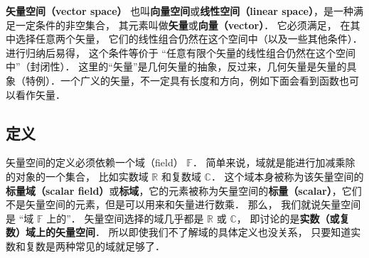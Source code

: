 

\textbf{矢量空间（vector space）} 也叫\textbf{向量空间}或\textbf{线性空间（linear space）}，是一种满足一定条件的非空集合， 其元素叫做\textbf{矢量}或\textbf{向量（vector）}． 它必须满足， 在其中选择任意两个矢量， 它们的线性组合仍然在这个空间中（以及一些其他条件）． 进行归纳后易得， 这个条件等价于 “任意有限个矢量的线性组合仍然在这个空间中”（封闭性）． 这里的“矢量”是几何矢量的抽象，反过来，几何矢量是矢量的具象（特例）．一个广义的矢量，不一定具有长度和方向，例如下面会看到函数也可以看作矢量．

\subsection{定义}
矢量空间的定义必须依赖一个域（field） $\mathbb F$． 简单来说，域就是能进行加减乘除的对象的一个集合， 比如实数域 $\mathbb R$ 和复数域 $\mathbb C$． 这个域本身被称为该矢量空间的\textbf{标量域（scalar field）}或\textbf{标域}，它的元素被称为矢量空间的\textbf{标量（scalar）}，它们不是矢量空间的元素，但是可以用来和矢量进行数乘． 那么， 我们就说矢量空间是 “域 $\mathbb{F}$ 上的”． 矢量空间选择的域几乎都是 $\mathbb{R}$ 或 $\mathbb{C}$， 即讨论的是\textbf{实数（或复数）域上的矢量空间}． 所以即使我们不了解域的具体定义也没关系， 只要知道实数和复数是两种常见的域就足够了．

